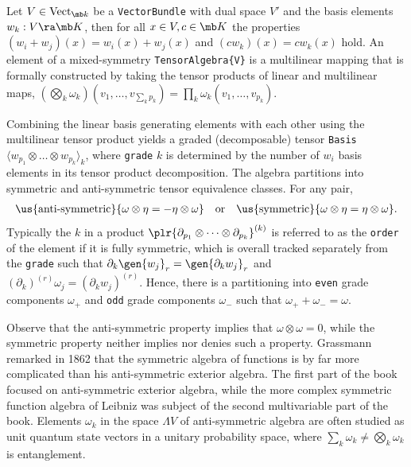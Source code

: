 \documentclass{juliacon}
\begin{document}
\begin{definition}
	Let $V\in\text{Vect}_{\mb k}$ be a \verb`VectorBundle` with dual space $V'$ and the basis elements $w_k:V\ra\mb K$, then for all $x\in V,c\in\mb K$ the properties $(w_i+w_j)(x) = w_i(x)+w_j(x)$ and $(cw_k)(x) = cw_k(x)$ hold.
	An element of a mixed-symmetry \verb`TensorAlgebra{V}` is a multilinear mapping that is formally constructed by taking the tensor products of linear and multilinear maps,
	$(\bigotimes_k \omega_k)(v_1,\dots,v_{\sum_k p_k}) = \prod_k \omega_k(v_1,\dots,v_{p_k})$.
\end{definition}
\begin{definition}
	Combining the linear basis generating elements with each other using the multilinear tensor product yields a graded (decomposable) tensor \verb`Basis` $\langle w_{p_1}\otimes\dots\otimes w_{p_k}\rangle_k$, where \verb`grade` $k$ is determined by the number of $w_i$ basis elements in its tensor product decomposition.
	The algebra partitions into symmetric and anti-symmetric tensor equivalence classes.
	For any pair, %
	\begin{align*}
		&\us{\text{anti-symmetric}}{\omega\otimes\eta = -\eta\otimes\omega} & \text{or} &  &\us{\text{symmetric}}{\omega\otimes\eta = \eta\otimes\omega}.
	\end{align*}
	Typically the $k$ in a product $\plr{\partial_{p_1}\otimes\cdots\otimes\partial_{p_k}}^{(k)}$ is referred to as the \verb`order` of the element if it is fully symmetric, which is overall tracked separately from the \verb`grade` such that $\partial_k\gen{w_j}_r = \gen{\partial_kw_j}_r$ and $(\partial_k)^{(r)}\omega_j = (\partial_kw_j)^{(r)}$.
	Hence, there is a partitioning into \verb`even` grade components $\omega_+$ and \verb`odd` grade components $\omega_-$ such that $\omega_++\omega_-=\omega$.
\end{definition}
\begin{remark}
	Observe that the anti-symmetric property implies that $\omega\otimes\omega=0$, while the symmetric property neither implies nor denies such a property.
	Grassmann remarked \cite{grassmann-2} in 1862 that the symmetric algebra of functions is by far more complicated than his anti-symmetric exterior algebra.
	The first part of the book focused on anti-symmetric exterior algebra, while the more complex symmetric function algebra of Leibniz was subject of the second multivariable part of the book.
	Elements $\omega_k$ in the space $\Lambda V$ of anti-symmetric algebra are often studied as unit quantum state vectors in a unitary probability space, where $\sum_k\omega_k\neq\bigotimes_k\omega_k$ is entanglement.
\end{remark}
\end{document}
